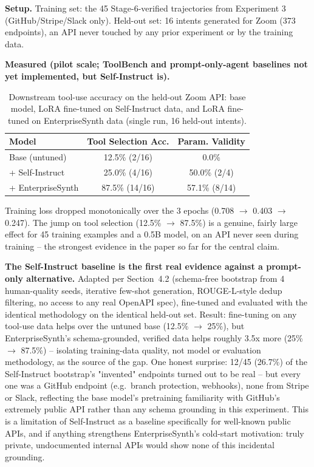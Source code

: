\documentclass[letterpaper]{article} %
\begin{document}
\textbf{Setup.} Training set: the 45 Stage-6-verified trajectories from Experiment 3
(GitHub/Stripe/Slack only). Held-out set: 16 intents generated for Zoom (373 endpoints), an API
never touched by any prior experiment or by the training data.

\textbf{Measured (pilot scale; ToolBench and prompt-only-agent baselines not yet implemented,
but Self-Instruct is).}

\begin{table}[htbp]
\centering
\footnotesize
\setlength{\tabcolsep}{2pt}
\caption{Downstream tool-use accuracy on the held-out Zoom API: base model, LoRA fine-tuned on
Self-Instruct data, and LoRA fine-tuned on EnterpriseSynth data (single run, 16 held-out intents).}
\label{tab:exp5-zoom}
\begin{tabular}{lcc}
\toprule
\textbf{Model} & \textbf{Tool Selection Acc.} & \textbf{Param. Validity} \\
\midrule
Base (untuned) & 12.5\% (2/16) & 0.0\% \\
+ Self-Instruct & 25.0\% (4/16) & 50.0\% (2/4) \\
+ EnterpriseSynth & 87.5\% (14/16) & 57.1\% (8/14) \\
\bottomrule
\end{tabular}
\end{table}

Training loss dropped monotonically over the 3 epochs (0.708 $\rightarrow$ 0.403 $\rightarrow$
0.247). The jump on tool selection (12.5\% $\rightarrow$ 87.5\%) is a genuine, fairly large effect
for 45 training examples and a 0.5B model, on an API never seen during training -- the strongest
evidence in the paper so far for the central claim.

\textbf{The Self-Instruct baseline is the first real evidence against a prompt-only alternative.} Adapted per Section~4.2
(schema-free bootstrap from 4 human-quality seeds, iterative few-shot generation, ROUGE-L-style
dedup filtering, no access to any real OpenAPI spec), fine-tuned and evaluated with the identical
methodology on the identical held-out set. Result: fine-tuning on any tool-use data helps over the
untuned base (12.5\% $\rightarrow$ 25\%), but EnterpriseSynth's schema-grounded, verified data
helps roughly 3.5x more (25\% $\rightarrow$ 87.5\%) -- isolating training-data quality, not model
or evaluation methodology, as the source of the gap. One honest surprise: 12/45 (26.7\%) of the
Self-Instruct bootstrap's "invented" endpoints turned out to be real -- but every one was a GitHub
endpoint (e.g.\ branch protection, webhooks), none from Stripe or Slack, reflecting the base
model's pretraining familiarity with GitHub's extremely public API rather than any schema
grounding in this experiment. This is a limitation of Self-Instruct as a baseline specifically for
well-known public APIs, and if anything strengthens EnterpriseSynth's cold-start motivation: truly
private, undocumented internal APIs would show none of this incidental grounding.
\end{document}
